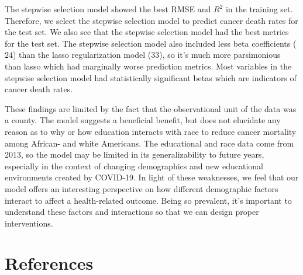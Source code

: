 \documentclass[
  11pt,
]{article}
\begin{document}
The stepwise selection model showed the best RMSE and \(R^2\) in the
training set. Therefore, we select the stepwise selection model to
predict cancer death rates for the test set. We also see that the
stepwise selection model had the best metrics for the test set. The
stepwise selection model also included less beta coefficients (\(24\))
than the lasso regularization model (\(33\)), so it's much more
parsimonious than lasso which had marginally worse prediction metrics.
Most variables in the stepwise selection model had statistically
significant betas which are indicators of cancer death rates.

These findings are limited by the fact that the observational unit of
the data was a county. The model suggests a beneficial benefit, but does
not elucidate any reason as to why or how education interacts with race
to reduce cancer mortality among African- and white Americans. The
educational and race data come from 2013, so the model may be limited in
its generalizability to future years, especially in the context of
changing demographics and new educational environments created by
COVID-19. In light of these weaknesses, we feel that our model offers an
interesting perspective on how different demographic factors interact to
affect a health-related outcome. Being so prevalent, it's important to
understand these factors and interactions so that we can design proper
interventions.

\pagebreak

\hypertarget{references}{%
\section{References}\label{references}}
\end{document}

